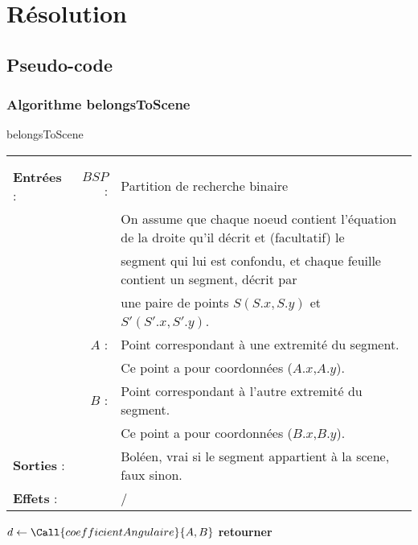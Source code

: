 \documentclass[10pt]{article}
\begin{document}
\newpage
\section{Résolution}
\subsection{Pseudo-code}
\subsubsection{Algorithme belongsToScene}
\begin{algorithm}[!h]
\caption{belongsToScene}
\begin{tabular}{lrl}
\\
&&\\
\textbf{Entrées} : &$BSP$ : &Partition de recherche binaire\\
& &On assume que chaque noeud contient l'équation de la droite qu'il décrit et (facultatif) le\\ 
& &segment qui lui est confondu, et chaque feuille contient un segment, décrit par\\
& &une paire de points $S(S.x,S.y)$ et $S'(S'.x,S'.y)$.\\ 
&$A$ : &Point correspondant à une extremité du segment.\\
& &Ce point a pour coordonnées ($A.x$,$A.y$).\\
&$B$ : &Point correspondant à l'autre extremité du segment.\\
& &Ce point a pour coordonnées ($B.x$,$B.y$).\\
\textbf{Sorties} :& &Boléen, vrai si le segment appartient à la scene, faux sinon.\\
\textbf{Effets} :& &/
\end{tabular}
\begin{algorithmic}[1]
\State $d\gets\Call{coefficientAngulaire}{A,B}$
\State \textbf{retourner} 
\EndProcedure
\end{algorithmic}
\end{algorithm}
\end{document}
